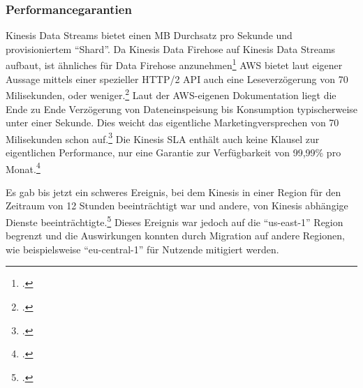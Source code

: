 \subsubsection{Performancegarantien}
Kinesis Data Streams bietet einen MB Durchsatz pro Sekunde und provisioniertem \enquote{Shard}. Da Kinesis Data Firehose auf Kinesis Data Streams aufbaut, ist ähnliches für Data Firehose anzunehmen\footcite[Vgl.][]{Pogosova.28.05.2020} 
\ac{AWS} bietet laut eigener Aussage mittels einer spezieller HTTP/2 \ac{API} auch eine Leseverzögerung von 70 Milisekunden, oder weniger.\footcite[Vgl.][]{AmazonWebServicesInc..o.J.af} 
Laut der \ac{AWS}-eigenen Dokumentation liegt die Ende zu Ende Verzögerung von Dateneinspeisung bis Konsumption typischerweise unter einer Sekunde. Dies weicht das eigentliche Marketingversprechen von 70 Milisekunden schon auf.\footcite[Vgl.][]{AmazonWebServicesInc..o.J.ae}
Die Kinesis \ac{SLA} enthält auch keine Klausel zur eigentlichen Performance, nur eine Garantie zur Verfügbarkeit von 99,99\% pro Monat.\footcite[Vgl.][]{AmazonWebServicesInc..o.J.ad} 

Es gab bis jetzt ein schweres Ereignis, bei dem Kinesis in einer Region für den Zeitraum von 12 Stunden beeinträchtigt war und andere, von Kinesis abhängige Dienste beeinträchtigte.\footcite[Vgl. auch im Folgenden][]{AmazonWebServicesInc..2020e} Dieses Ereignis war jedoch auf die \enquote{us-east-1} Region begrenzt und die Auswirkungen konnten durch Migration auf andere Regionen, wie beispielsweise \enquote{eu-central-1} für Nutzende mitigiert werden.


